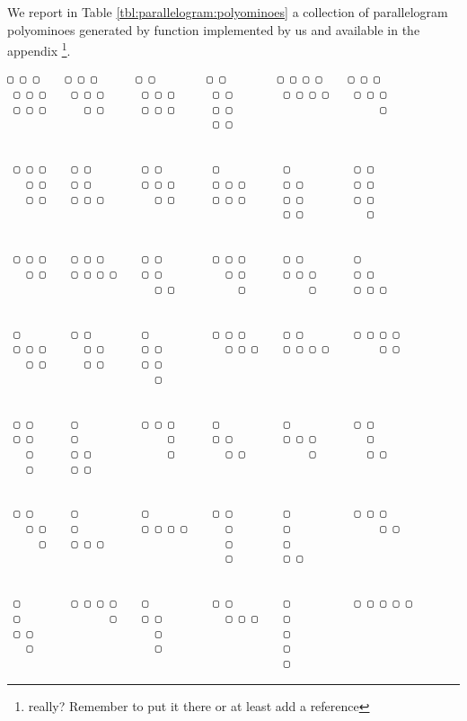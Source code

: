 We report in Table \ref{tbl:parallelogram:polyominoes}
a collection of parallelogram polyominoes generated by function
implemented by us and available in the appendix \footnote{really? Remember to
put it there or at least add a reference}.
\begin{table}
\begin{Verbatim}[baselinestretch=0.5, fontsize=\small]
 ▢ ▢ ▢    ▢ ▢ ▢      ▢ ▢        ▢ ▢        ▢ ▢ ▢ ▢    ▢ ▢ ▢
 ▢ ▢ ▢    ▢ ▢ ▢      ▢ ▢ ▢      ▢ ▢        ▢ ▢ ▢ ▢    ▢ ▢ ▢
 ▢ ▢ ▢      ▢ ▢      ▢ ▢ ▢      ▢ ▢                       ▢
                                ▢ ▢


 ▢ ▢ ▢    ▢ ▢        ▢ ▢        ▢          ▢          ▢ ▢
   ▢ ▢    ▢ ▢        ▢ ▢ ▢      ▢ ▢ ▢      ▢ ▢        ▢ ▢
   ▢ ▢    ▢ ▢ ▢        ▢ ▢      ▢ ▢ ▢      ▢ ▢        ▢ ▢
                                           ▢ ▢          ▢


 ▢ ▢ ▢    ▢ ▢ ▢      ▢ ▢        ▢ ▢ ▢      ▢ ▢        ▢
   ▢ ▢    ▢ ▢ ▢ ▢    ▢ ▢          ▢ ▢      ▢ ▢ ▢      ▢ ▢
                       ▢ ▢          ▢          ▢      ▢ ▢ ▢


 ▢        ▢ ▢        ▢          ▢ ▢ ▢      ▢ ▢        ▢ ▢ ▢ ▢
 ▢ ▢ ▢      ▢ ▢      ▢ ▢          ▢ ▢ ▢    ▢ ▢ ▢ ▢        ▢ ▢
   ▢ ▢      ▢ ▢      ▢ ▢
                       ▢


 ▢ ▢      ▢          ▢ ▢ ▢      ▢          ▢          ▢ ▢
 ▢ ▢      ▢              ▢      ▢ ▢        ▢ ▢ ▢        ▢
   ▢      ▢ ▢            ▢        ▢ ▢          ▢        ▢ ▢
   ▢      ▢ ▢


 ▢ ▢      ▢          ▢          ▢ ▢        ▢          ▢ ▢ ▢
   ▢ ▢    ▢          ▢ ▢ ▢ ▢      ▢        ▢              ▢ ▢
     ▢    ▢ ▢ ▢                   ▢        ▢
                                  ▢        ▢ ▢


 ▢        ▢ ▢ ▢ ▢    ▢          ▢ ▢        ▢          ▢ ▢ ▢ ▢ ▢
 ▢              ▢    ▢ ▢          ▢ ▢ ▢    ▢
 ▢ ▢                   ▢                   ▢
   ▢                   ▢                   ▢
                                           ▢
\end{Verbatim}
\caption{Parallelogram Polyominoes with semiperimeter $6$,
which are $42$ in total, the $6$th Catalan number.}
\label{tbl:parallelogram:polyominoes}
\end{table}

